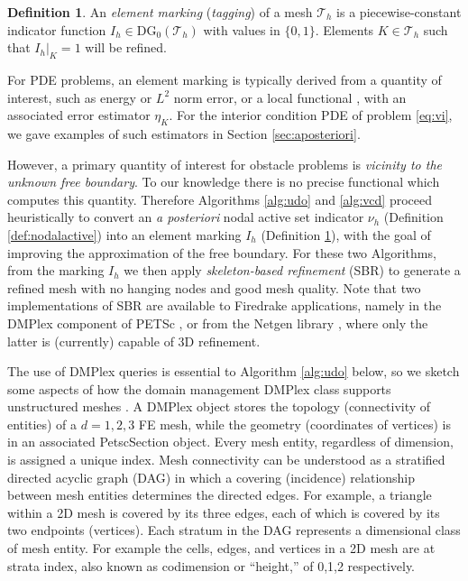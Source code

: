 \documentclass[]{interact}
\theoremstyle{plain}%
\theoremstyle{definition}
\newtheorem{definition}[theorem]{Definition}
\theoremstyle{remark}
\newcommand{\cT}{\mathcal{T}}
\newcommand{\DG}{\text{DG}}
\begin{document}
\begin{definition} \label{def:marking}
An \emph{element marking} (\emph{tagging}) of a mesh $\cT_h$ is a piecewise-constant indicator function $I_h \in \DG_0(\cT_h)$ with values in $\{0,1\}$.  Elements $K \in \cT_h$ such that $I_h|_K=1$ will be refined.
\end{definition}

For PDE problems, an element marking is typically derived from a quantity of interest, such as energy or $L^2$ norm error, or a local functional \cite{BangerthRannacher2003}, with an associated error estimator $\eta_K$.  For the interior condition PDE of problem \eqref{eq:vi}, we gave examples of such estimators in Section \ref{sec:aposteriori}.

However, a primary quantity of interest for obstacle problems is \emph{vicinity to the unknown free boundary}.  To our knowledge there is no precise functional which computes this quantity.  Therefore Algorithms \ref{alg:udo} and \ref{alg:vcd} proceed heuristically to convert an \emph{a posteriori} nodal active set indicator $\nu_h$ (Definition \ref{def:nodalactive}) into an element marking $I_h$ (Definition \ref{def:marking}), with the goal of improving the approximation of the free boundary.  For these two Algorithms, from the marking $I_h$ we then apply \emph{skeleton-based refinement} (SBR) \cite{PlazaCarey2000} to generate a refined mesh with no hanging nodes and good mesh quality.  Note that two implementations of SBR are available to Firedrake applications, namely in the DMPlex component of PETSc \cite{petsc-user-ref}, or from the Netgen library \cite{Betteridgeetal2024}, where only the latter is (currently) capable of 3D refinement.

The use of DMPlex queries is essential to Algorithm \ref{alg:udo} below, so we sketch some aspects of how the domain management DMPlex class supports unstructured meshes \cite{Langeetal2016}.  A DMPlex object stores the topology (connectivity of entities) of a $d=1,2,3$ FE mesh, while the geometry (coordinates of vertices) is in an associated PetscSection object.  Every mesh entity, regardless of dimension, is assigned a unique index.  Mesh connectivity can be understood as a stratified directed acyclic graph (DAG) in which a covering (incidence) relationship between mesh entities determines the directed edges.  For example, a triangle within a 2D mesh is covered by its three edges, each of which is covered by its two endpoints (vertices).  Each stratum in the DAG represents a dimensional class of mesh entity.  For example the cells, edges, and vertices in a 2D mesh are at strata index, also known as codimension or ``height,'' of 0,1,2 respectively.
\end{document}
